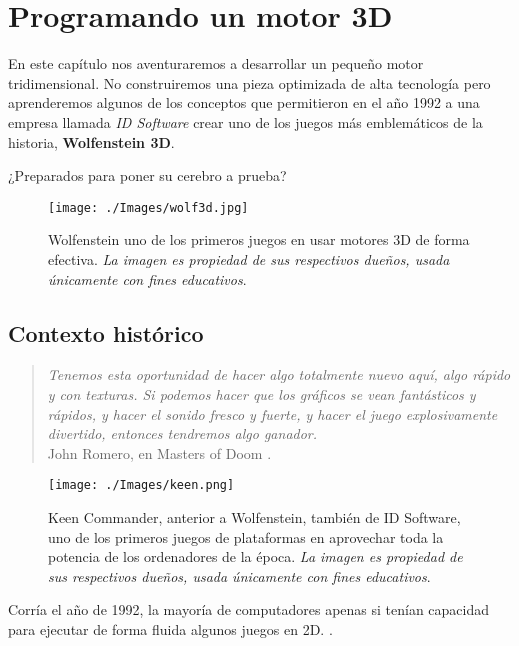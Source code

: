 \chapter{Programando un motor 3D}
\label{chap:motor-3d}

En este capítulo nos aventuraremos a desarrollar un pequeño motor tridimensional. No construiremos una pieza optimizada de alta tecnología pero aprenderemos algunos de los conceptos que permitieron en el año 1992 a una empresa llamada \emph{ID Software} crear uno de los juegos más emblemáticos de la historia, \textbf{Wolfenstein 3D}.

¿Preparados para poner su cerebro a prueba?

\begin{figure}[h!]
	\centering
	\texttt{[image: ./Images/wolf3d.jpg]}
	\caption{Wolfenstein uno de los primeros juegos en usar motores 3D de forma efectiva. \emph{La imagen es propiedad de sus respectivos dueños, usada únicamente con fines educativos}.}
	\label{wolf3d}
\end{figure}

\section{Contexto histórico}

\begin{quote}
	\emph{Tenemos esta oportunidad de hacer algo totalmente nuevo aquí, algo rápido y con texturas. Si podemos hacer que los gráficos se vean fantásticos y rápidos, y hacer el sonido fresco y fuerte, y hacer el juego explosivamente divertido, entonces tendremos algo ganador.} \\
	John Romero, en Masters of Doom \cite[p.~92]{doom}.
\end{quote}


\begin{figure}[h!]
	\centering
	\texttt{[image: ./Images/keen.png]}
	\caption{Keen Commander, anterior a Wolfenstein, también de ID Software, uno de los primeros juegos de plataformas en aprovechar toda la potencia de los ordenadores de la época. \emph{La imagen es propiedad de sus respectivos dueños, usada únicamente con fines educativos}.}
	\label{keen}
\end{figure}

Corría el año de 1992, la mayoría de computadores apenas si tenían capacidad para ejecutar de forma fluida algunos juegos en 2D. \emph{}.


